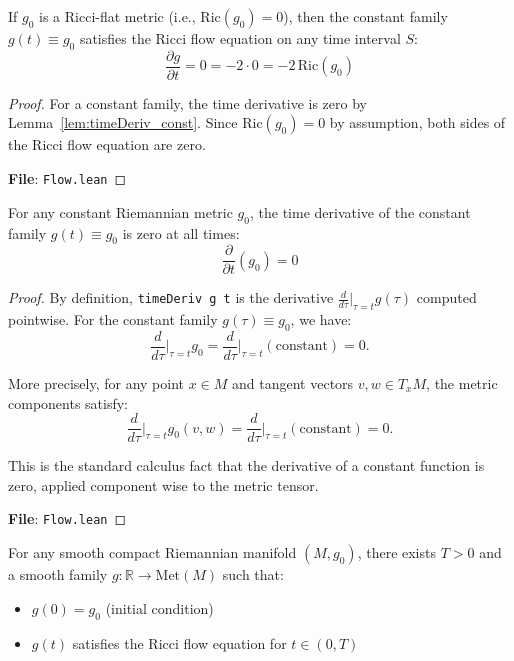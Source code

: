 \begin{lemma}
\label{lem:ricciFlowEqOn_const_of_ricciFlat}
\leanok
{}
If $g_0$ is a Ricci-flat metric (i.e., $\mathrm{Ric}(g_0) = 0$), then the constant family $g(t) \equiv g_0$ satisfies the Ricci flow equation on any time interval $S$:
\[ \frac{\partial g}{\partial t} = 0 = -2 \cdot 0 = -2 \, \mathrm{Ric}(g_0) \]
\end{lemma}

\begin{proof}
\leanok
{}
For a constant family, the time derivative is zero by Lemma~\ref{lem:timeDeriv_const}. Since $\mathrm{Ric}(g_0) = 0$ by assumption, both sides of the Ricci flow equation are zero.

\textbf{File}: \texttt{Flow.lean}
\end{proof}

\begin{lemma}
\label{lem:timeDeriv_const}
\leanok
{}
For any constant Riemannian metric $g_0$, the time derivative of the constant family $g(t) \equiv g_0$ is zero at all times:
\[ \frac{\partial}{\partial t}(g_0) = 0 \]
\end{lemma}

\begin{proof}
\leanok
{}
By definition, \texttt{timeDeriv g t} is the derivative $\frac{d}{d\tau}\big|_{\tau=t} g(\tau)$ computed pointwise. For the constant family $g(\tau) \equiv g_0$, we have:
\[
\frac{d}{d\tau}\big|_{\tau=t} g_0 = \frac{d}{d\tau}\big|_{\tau=t} (\text{constant}) = 0.
\]

More precisely, for any point $x \in M$ and tangent vectors $v, w \in T_x M$, the metric components satisfy:
\[
\frac{d}{d\tau}\big|_{\tau=t} g_0(v, w) = \frac{d}{d\tau}\big|_{\tau=t} (\text{constant}) = 0.
\]

This is the standard calculus fact that the derivative of a constant function is zero, applied component wise to the metric tensor.

\textbf{File}: \texttt{Flow.lean}
\end{proof}

\begin{theorem}
\label{axiom:hamilton_ste}
For any smooth compact Riemannian manifold $(M, g_0)$, there exists $T > 0$ and a smooth family $g : \mathbb{R} \to \mathrm{Met}(M)$ such that:
\begin{itemize}
\item $g(0) = g_0$ (initial condition)
\item $g(t)$ satisfies the Ricci flow equation for $t \in (0, T)$
\end{itemize}
\end{theorem}


